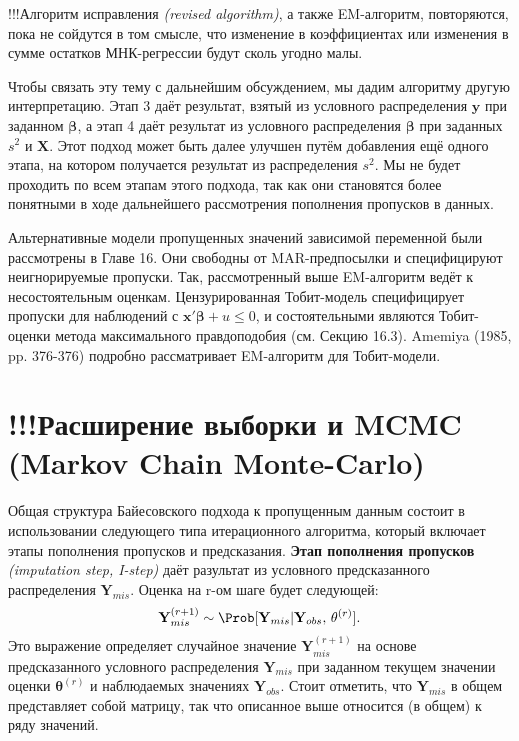 !!!Алгоритм исправления \emph{(revised algorithm)}, а также EM-алгоритм, повторяются, пока не сойдутся в том смысле, что изменение в коэффициентах или изменения в сумме остатков МНК-регрессии будут сколь угодно малы.

Чтобы связать эту тему с дальнейшим обсуждением, мы дадим алгоритму другую интерпретацию. Этап 3 даёт результат, взятый из условного распределения $\mathbf{y}$ при заданном $\mathbf{\beta}$, а этап 4 даёт результат из условного распределения $\mathbf{\beta}$ при заданных $s^2$ и $\mathbf{X}$. Этот подход может быть далее улучшен путём добавления ещё одного этапа, на котором получается результат из распределения $s^2$. Мы не будет проходить по всем этапам этого подхода, так как они становятся более понятными в ходе дальнейшего рассмотрения пополнения пропусков в данных.

Альтернативные модели пропущенных значений зависимой переменной были рассмотрены в Главе 16. Они свободны от MAR-предпосылки и специфицируют неигнорируемые пропуски. Так, рассмотренный выше EM-алгоритм ведёт к несостоятельным оценкам. Цензурированная Тобит-модель специфицирует пропуски для наблюдений с $\mathbf{x'\beta}+u \leqslant 0$, и состоятельными являются Тобит-оценки метода максимального правдоподобия (см. Секцию 16.3). Amemiya (1985, pp. 376-376) подробно рассматривает EM-алгоритм для Тобит-модели.

\section{!!!Расширение выборки и MCMC (Markov Chain Monte-Carlo)}
Общая структура Байесовского подхода к пропущенным данным состоит в использовании следующего типа итерационного алгоритма, который включает этапы пополнения пропусков и предсказания. 
{\bf Этап пополнения пропусков} \emph{(imputation step, I-step)} даёт разультат из условного предсказанного распределения $\mathbf{Y}_{mis}$. Оценка на r-ом шаге будет следующей:
\begin{equation}
\mathbf{Y}_{mis}^{(r+1)} \sim \Prob[\mathbf{Y}_{mis}|\mathbf{Y}_{obs}, \, \mathbf{\theta}^{(r)}].
\end{equation}
Это выражение определяет случайное значение $\mathbf{Y}_{mis}^{(r+1)}$ на основе предсказанного условного распределения $\mathbf{Y}_{mis}$ при заданном текущем значении оценки $\mathbf{\theta}^{(r)}$ и наблюдаемых значениях $\mathbf{Y}_{obs}$. Стоит отметить, что $\mathbf{Y}_{mis}$ в общем представляет собой матрицу, так что описанное выше относится  (в общем) к ряду значений.

